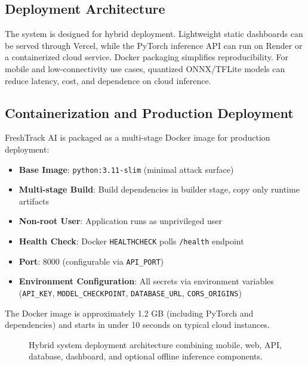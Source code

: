 \documentclass[conference]{IEEEtran}
\begin{document}
\subsection{Deployment Architecture}
The system is designed for hybrid deployment. Lightweight static dashboards can be served through Vercel, while the PyTorch inference API can run on Render or a containerized cloud service. Docker packaging simplifies reproducibility. For mobile and low-connectivity use cases, quantized ONNX/TFLite models can reduce latency, cost, and dependence on cloud inference.

\subsection{Containerization and Production Deployment}
FreshTrack AI is packaged as a multi-stage Docker image for production deployment:
\begin{itemize}
    \item \textbf{Base Image}: \texttt{python:3.11-slim} (minimal attack surface)
    \item \textbf{Multi-stage Build}: Build dependencies in builder stage, copy only runtime artifacts
    \item \textbf{Non-root User}: Application runs as unprivileged user
    \item \textbf{Health Check}: Docker \texttt{HEALTHCHECK} polls \texttt{/health} endpoint
    \item \textbf{Port}: 8000 (configurable via \texttt{API\_PORT})
    \item \textbf{Environment Configuration}: All secrets via environment variables (\texttt{API\_KEY}, \texttt{MODEL\_CHECKPOINT}, \texttt{DATABASE\_URL}, \texttt{CORS\_ORIGINS})
\end{itemize}

The Docker image is approximately 1.2 GB (including PyTorch and dependencies) and starts in under 10 seconds on typical cloud instances.

\begin{figure}[t]
\centering
{}
\caption{Hybrid system deployment architecture combining mobile, web, API, database, dashboard, and optional offline inference components.}
\label{fig:deployment}
\end{figure}
\end{document}
